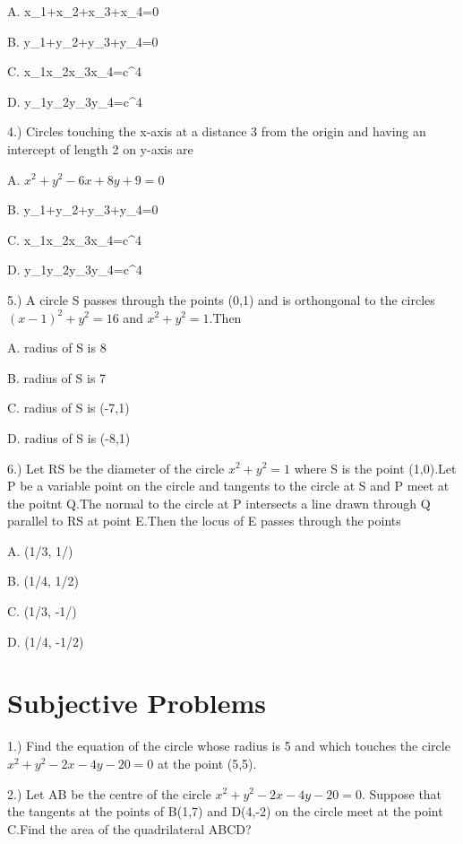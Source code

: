 \documentclass{article}
\begin{document}
\choice  A. x_1+x_2+x_3+x_4=0

\choice  B. y_1+y_2+y_3+y_4=0

\choice  C. x_1x_2x_3x_4=c^4

\choice  D. y_1y_2y_3y_4=c^4

\vspace{5mm}
4.) Circles touching the x-axis at a distance 3 from the origin and having an intercept of length 2    on y-axis are 

\choice  A. $x^2+y^2-6x+8y+9=0$

\choice  B. y_1+y_2+y_3+y_4=0

\choice  C. x_1x_2x_3x_4=c^4

\choice  D. y_1y_2y_3y_4=c^4

\vspace{5mm}
5.) A circle S passes through the points (0,1) and is orthongonal to the circles $(x-1)^2+y^2=16$ and $x^2+y^2=1$.Then  

\choice  A. radius of S is 8

\choice  B. radius of S is 7

\choice  C. radius of S is (-7,1)

\choice  D. radius of S is (-8,1)

\vspace{5mm}
6.) Let RS be the diameter of the circle $x^2+y^2=1$ where S is the point (1,0).Let P be a variable point on the circle and tangents to the circle at S and P meet at the poitnt Q.The normal to the circle at P intersects a line drawn through Q parallel to RS at point E.Then the locus of E passes through the points 

\choice  A. (1/3, 1/)

\choice  B.  (1/4, 1/2)

\choice  C.  (1/3, -1/)

\choice  D.  (1/4, -1/2)

\vspace{5mm}

\section{Subjective Problems}

1.) Find the equation of the circle whose radius is 5 and which touches the circle $x^2+y^2-2x-4y-20=0$ at the point (5,5).

\vspace{5mm}
2.) Let AB be the centre of the circle $x^2+y^2-2x-4y-20=0$. Suppose that the tangents at the points of B(1,7) and D(4,-2) on the circle meet at the point C.Find the area of the quadrilateral ABCD?
\end{document}
